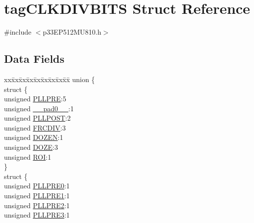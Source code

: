 \hypertarget{structtag_c_l_k_d_i_v_b_i_t_s}{}\section{tag\+C\+L\+K\+D\+I\+V\+B\+I\+TS Struct Reference}
\label{structtag_c_l_k_d_i_v_b_i_t_s}


{\ttfamily \#include $<$p33\+E\+P512\+M\+U810.\+h$>$}

\subsection*{Data Fields}
\begin{DoxyCompactItemize}
\item 
\begin{tabbing}
xx\=xx\=xx\=xx\=xx\=xx\=xx\=xx\=xx\=\kill
union \{\\
\>struct \{\\
\>\>unsigned \hyperlink{structtag_c_l_k_d_i_v_b_i_t_s_a39b8a5f7572504bbf061365a489528c4}{PLLPRE}:5\\
\>\>unsigned \hyperlink{structtag_c_l_k_d_i_v_b_i_t_s_adf71f3d8410c1f1dbbc96680a92c49af}{\_\_pad0\_\_}:1\\
\>\>unsigned \hyperlink{structtag_c_l_k_d_i_v_b_i_t_s_ae9fcf83e93b936d8e6761ac80364917f}{PLLPOST}:2\\
\>\>unsigned \hyperlink{structtag_c_l_k_d_i_v_b_i_t_s_a30df48c898df0f837a2c9d449e56cd42}{FRCDIV}:3\\
\>\>unsigned \hyperlink{structtag_c_l_k_d_i_v_b_i_t_s_abe0625102922c671e4af2c0cb5857ddd}{DOZEN}:1\\
\>\>unsigned \hyperlink{structtag_c_l_k_d_i_v_b_i_t_s_a3ca4a5ba39b14c8b599d8c9b05e35689}{DOZE}:3\\
\>\>unsigned \hyperlink{structtag_c_l_k_d_i_v_b_i_t_s_ac2c7f9712fe29871c3e7846eb2f5c770}{ROI}:1\\
\>\} \\
\>struct \{\\
\>\>unsigned \hyperlink{structtag_c_l_k_d_i_v_b_i_t_s_aa232ac2a91e020a79930003f95b08b1e}{PLLPRE0}:1\\
\>\>unsigned \hyperlink{structtag_c_l_k_d_i_v_b_i_t_s_ab86a684fc04ed512c57cf483d5a675af}{PLLPRE1}:1\\
\>\>unsigned \hyperlink{structtag_c_l_k_d_i_v_b_i_t_s_aad87c9458c61bbb132689e0ea8be6b5d}{PLLPRE2}:1\\
\>\>unsigned \hyperlink{structtag_c_l_k_d_i_v_b_i_t_s_a6cac311c5c7b7bbcfbf6733e81d541ec}{PLLPRE3}:1\\

\end{tabbing}
\end{DoxyCompactItemize}
